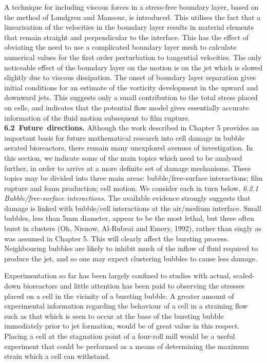 A technique for including viscous forces in a stress-free boundary
layer, based on the method of Lundgren and Mansour, is introduced. 
This utilises the fact that a linearisation of the velocities in
the boundary layer results in material elements that remain straight
and perpendicular to the interface. This has the
effect of obviating the need to use a complicated boundary layer
mesh to calculate numerical values for the first order perturbation 
to tangential velocities.
The only noticeable effect of the boundary layer on the
motion is on the jet which is slowed slightly due to viscous dissipation.
The onset of boundary layer separation gives initial conditions for an estimate
of the vorticity development in the upward and downward jets.
This suggests only a small contribution to the total stress placed on cells,
and indicates that the potential flow model gives essentially accurate
information of the fluid motion subsequent to film rupture.
\vskip 15pt
\hbox{\bf 6.2 Future directions.}
\vskip 5pt
Although the work described in Chapter 5 provides an important basis
for future mathematical research into cell damage in bubble aerated bioreactors,
there remain many unexplored avenues of investigation.  In this section, we
indicate some of the main topics which need to be analysed further,
in order to arrive at a more definite set of damage mechanisms.
These topics may be divided into three main areas: bubble/free-surface
interactions; film rupture and foam production; cell motion. 
We consider each in turn below.
\vskip 15pt
\c{\it 6.2.1 Bubble/free-surface interactions.}
\nobreak
\vskip 5pt
The available evidence strongly suggests that
damage is linked with bubble/cell
interactions at the air/medium interface. Small bubbles, less than 5mm diameter,
appear to be the most lethal, but these often burst in clusters 
(Oh, Nienow, Al-Rubeai and Emery, 1992), 
rather than singly as was assumed in Chapter 5. This will clearly
affect the bursting process. Neighbouring bubbles are likely to 
inhibit much of the inflow of fluid required to produce the jet, and so one may
expect clustering bubbles to cause less damage.

Experimentation so far has been largely confined to 
studies with actual, scaled-down bioreactors and little
attention has been paid to observing the stresses placed on a cell
in the vicinity of a bursting bubble. A greater amount of experimental
information regarding the behaviour of a cell in a straining flow such
as that which is seen to occur at the base of the bursting bubble immediately
prior to jet formation, would be of great value in this respect.
Placing a cell at the stagnation point of a four-roll mill would be a 
useful experiment that could be performed as a means of 
determining the maximum strain which a cell can withstand.

